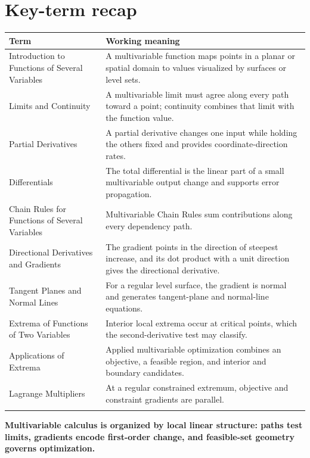 \documentclass[11pt]{article}
\begin{document}
\section{Key-term recap}
\small
\begin{longtable}{@{}>{\RaggedRight\arraybackslash}p{}>{\RaggedRight\arraybackslash}p{}@{}}
\toprule
\textbf{Term} & \textbf{Working meaning}\\
\midrule\endhead
Introduction to Functions of Several Variables & A multivariable function maps points in a planar or spatial domain to values visualized by surfaces or level sets. \\\addlinespace[2pt]
Limits and Continuity & A multivariable limit must agree along every path toward a point; continuity combines that limit with the function value. \\\addlinespace[2pt]
Partial Derivatives & A partial derivative changes one input while holding the others fixed and provides coordinate-direction rates. \\\addlinespace[2pt]
Differentials & The total differential is the linear part of a small multivariable output change and supports error propagation. \\\addlinespace[2pt]
Chain Rules for Functions of Several Variables & Multivariable Chain Rules sum contributions along every dependency path. \\\addlinespace[2pt]
Directional Derivatives and Gradients & The gradient points in the direction of steepest increase, and its dot product with a unit direction gives the directional derivative. \\\addlinespace[2pt]
Tangent Planes and Normal Lines & For a regular level surface, the gradient is normal and generates tangent-plane and normal-line equations. \\\addlinespace[2pt]
Extrema of Functions of Two Variables & Interior local extrema occur at critical points, which the second-derivative test may classify. \\\addlinespace[2pt]
Applications of Extrema & Applied multivariable optimization combines an objective, a feasible region, and interior and boundary candidates. \\\addlinespace[2pt]
Lagrange Multipliers & At a regular constrained extremum, objective and constraint gradients are parallel. \\\addlinespace[2pt]
\bottomrule
\end{longtable}
\normalsize

\enlargethispage{4\baselineskip}
\begin{tcolorbox}[title=One-sentence takeaway,fonttitle=\bfseries,colback=Ink,colframe=Ink,coltext=white,coltitle=white,arc=2mm,boxrule=0pt]
\centering\bfseries Multivariable calculus is organized by local linear structure: paths test limits, gradients encode first-order change, and feasible-set geometry governs optimization.
\end{tcolorbox}
\end{document}
